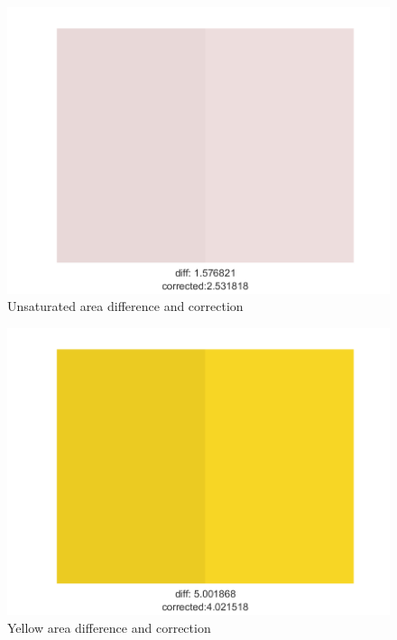 \documentclass[twocolumn,a4paper]{article}
\begin{document}
\begin{figure}[H]
	\centering
	\includegraphics[scale=0.5]{images/example_unsaturated_2.png}
	\caption{Unsaturated area difference and correction}
	\label{fig:unsaturated_example}
\end{figure}

\begin{figure}[H]
	\centering
	\includegraphics[scale=0.5]{images/example_yellows.png}
	\caption{Yellow area difference and correction}
	\label{fig:yellows_example}
\end{figure}
\end{document}
